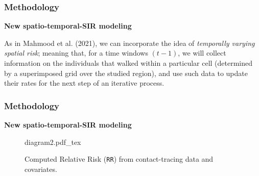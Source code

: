 \documentclass[12pt, aspectratio = 169]{beamer} %
\begin{document}
	\begin{frame}[t]
		\frametitle{Methodology}
		\justifying
		\textcolor{titles}{\textbf{New spatio-temporal-SIR modeling}}
		
		As in Mahmood et al${.}$ (2021), we can incorporate the idea of \textit{temporally varying spatial risk}; meaning that, for a time windows $(t-1)$, we will collect information on the individuals that walked within a particular cell (determined by a superimposed grid over the studied region), and use such data to update their rates for the next step of an iterative process.
		
		
		
	\end{frame}

	\begin{frame}[t]
		\frametitle{Methodology}
		\justifying
		\textcolor{titles}{\textbf{New spatio-temporal-SIR modeling}}		
		\begin{figure}[!ht]
			\centering
			\def\svgwidth{\columnwidth}{diagram2.pdf_tex}
			\caption{\justifying Computed Relative Risk (\texttt{RR}) from contact-tracing data and covariates.}
			\label{fig:rr-modeling}
		\end{figure}
	\end{frame}
\end{document}
